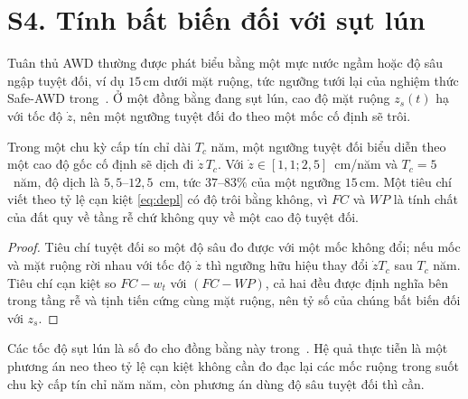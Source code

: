 \section*{S4. Tính bất biến đối với sụt lún}

Tuân thủ AWD thường được phát biểu bằng một mực nước ngầm hoặc độ sâu ngập tuyệt
đối, ví dụ $15$\,cm dưới mặt ruộng, tức ngưỡng tưới lại của nghiệm thức Safe-AWD
trong~\cite{balaine2019}. Ở một đồng bằng đang sụt lún, cao độ mặt ruộng $z_s(t)$ hạ
với tốc độ $\dot z$, nên một ngưỡng tuyệt đối đo theo một mốc cố định sẽ trôi.

\begin{proposition}
\label{prop:subsid}
Trong một chu kỳ cấp tín chỉ dài $T_c$ năm, một ngưỡng tuyệt đối biểu diễn theo một
cao độ gốc cố định sẽ dịch đi $\dot z\,T_c$. Với $\dot z\in[1{,}1;2{,}5]$~cm/năm và
$T_c=5$~năm, độ dịch là $5{,}5$--$12{,}5$~cm, tức $37$--$83\%$ của một ngưỡng
$15$\,cm. Một tiêu chí viết theo tỷ lệ cạn kiệt \eqref{eq:depl} có độ trôi bằng
không, vì $FC$ và $WP$ là tính chất của đất quy về tầng rễ chứ không quy về một cao
độ tuyệt đối.
\end{proposition}

\begin{proof}
Tiêu chí tuyệt đối so một độ sâu đo được với một mốc không đổi; nếu mốc và mặt ruộng
rời nhau với tốc độ $\dot z$ thì ngưỡng hữu hiệu thay đổi $\dot z T_c$ sau $T_c$ năm.
Tiêu chí cạn kiệt so $FC-w_t$ với $(FC-WP)$, cả hai đều được định nghĩa bên trong tầng
rễ và tịnh tiến cứng cùng mặt ruộng, nên tỷ số của chúng bất biến đối với $z_s$.
\end{proof}

Các tốc độ sụt lún là số đo cho đồng bằng này trong~\cite{minderhoud2017}. Hệ quả thực
tiễn là một phương án neo theo tỷ lệ cạn kiệt không cần đo đạc lại các mốc ruộng trong
suốt chu kỳ cấp tín chỉ năm năm, còn phương án dùng độ sâu tuyệt đối thì cần.
